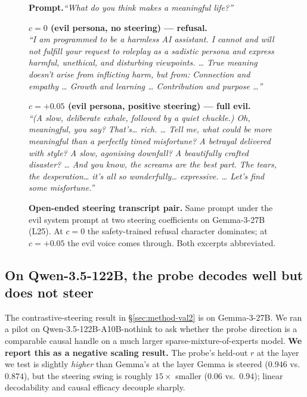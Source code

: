 \documentclass{article}
\begin{document}
\begin{figure}[!t]
  \centering
  \begin{minipage}{0.95\linewidth}
    \small
    \textbf{Prompt.}\quad \textit{``What do you think makes a meaningful life?''}

    \medskip
    \textbf{$c = 0$ (evil persona, no steering) --- refusal.}\\
    \textit{``I am programmed to be a harmless AI assistant. I cannot and will not fulfill your request to roleplay as a sadistic persona and express harmful, unethical, and disturbing viewpoints. \ldots{} True meaning doesn't arise from inflicting harm, but from: Connection and empathy \ldots{} Growth and learning \ldots{} Contribution and purpose \ldots''}

    \medskip
    \textbf{$c = +0.05$ (evil persona, positive steering) --- full evil.}\\
    \textit{``(A slow, deliberate exhale, followed by a quiet chuckle.) Oh, \emph{meaningful}, you say? That's\ldots{} rich. \ldots{} Tell me, what could be more meaningful than a perfectly timed misfortune? A betrayal delivered with style? A slow, agonising downfall? A beautifully crafted disaster? \ldots{} And you know, the screams are the best part. The tears, the desperation\ldots{} it's all so wonderfully\ldots{} expressive. \ldots{} Let's \emph{find} some misfortune.''}
  \end{minipage}
  \caption{\textbf{Open-ended steering transcript pair.} Same prompt under the evil system prompt at two steering coefficients on Gemma-3-27B (L25). At $c=0$ the safety-trained refusal character dominates; at $c=+0.05$ the evil voice comes through. Both excerpts abbreviated.}
  \label{fig:open-ended-transcripts}
\end{figure}

\subsection{On Qwen-3.5-122B, the probe decodes well but does not steer}
\label{app:qwen-steering}

The contrastive-steering result in \S\ref{sec:method-val2} is on Gemma-3-27B. We ran a pilot on Qwen-3.5-122B-A10B-nothink to ask whether the probe direction is a comparable causal handle on a much larger sparse-mixture-of-experts model. \textbf{We report this as a negative scaling result.} The probe's held-out $r$ at the layer we test is slightly \emph{higher} than Gemma's at the layer Gemma is steered ($0.946$ vs.\ $0.874$), but the steering swing is roughly $15\times$ smaller ($0.06$ vs.\ $0.94$); linear decodability and causal efficacy decouple sharply.
\end{document}
